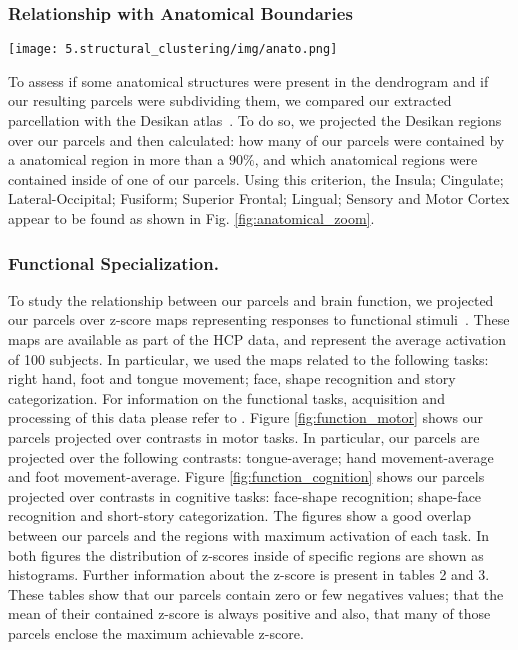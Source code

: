 \subsubsection{Relationship with Anatomical Boundaries}
%
\begin{figure*}
    \texttt{[image: 5.structural\_clustering/img/anato.png]}
    \caption{Relation between our pure extrinsic parcellation and the anatomical
             atlas of Desikan~\citep{Desikan2006}. Desikan atlas
             projected over the groupwise parcellation with 55 parcels.
             Insula; Cingulate; Lateral-Occipital; Fusiform; Superior Frontal;
             Lingual; Sensory and  Motor Cortex appear to be found.}
    \label{fig:anatomical_zoom}
\end{figure*}
%
To assess if some anatomical structures were present in the dendrogram and 
if our resulting parcels were subdividing them, we compared our extracted
parcellation with the Desikan atlas~\citep{Desikan2006}. To do so, we projected 
the Desikan regions over our parcels and then calculated: how many of our parcels
were contained by a anatomical region in more than a $90\%$, and which anatomical
regions were contained inside of one of our parcels. Using this criterion, the Insula; 
Cingulate; Lateral-Occipital; Fusiform; Superior Frontal; Lingual; Sensory and
Motor Cortex appear to be found as shown in Fig. \ref{fig:anatomical_zoom}.
%
\subsubsection{Functional Specialization.}
%
To study the relationship between our parcels and brain function, we projected our 
parcels over z-score maps representing responses to functional 
stimuli~\citep{Barch2013}. These maps are available as part of the HCP data, 
and represent the average activation of 100 subjects. In particular, we used
the maps related to 
the following tasks: right hand, foot and tongue movement; face, shape
recognition  and story categorization. For information on the functional tasks,
acquisition and processing of this data please refer to \citet{Barch2013}. 
Figure \ref{fig:function_motor} shows our parcels projected over contrasts
in motor tasks. In particular, our parcels are projected over the following
contrasts: tongue-average; hand movement-average and foot movement-average. 
Figure \ref{fig:function_cognition} shows our parcels projected over contrasts
in cognitive tasks: face-shape recognition; shape-face recognition and short-story
categorization. The figures show a good overlap between our parcels and the
regions with maximum activation of each task. In both figures the distribution
of z-scores inside of specific regions are shown as histograms. Further 
information about the z-score is present in tables 2 and 3. These tables show
that our parcels contain zero or few negatives values; that the mean of their
contained z-score is always positive and also, that many of those parcels 
enclose the maximum achievable z-score.

